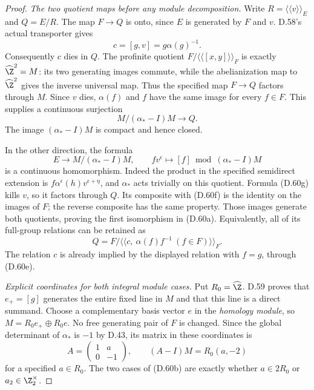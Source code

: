 \begin{proof}
\emph{The two quotient maps before any module decomposition.}
Write $R=\langle\!\langle v\rangle\!\rangle_E$ and
$Q=E/R$. The map $F\to Q$ is onto, since $E$
is generated by $F$ and $v$.
D.58's actual transporter gives
\[
                  c=[g,v]=g\alpha(g)^{-1}.               \tag{D.60e}
\]
Consequently $c$ dies in $Q$.
The profinite quotient
$F/\langle\!\langle[x,y]\rangle\!\rangle_F$
is exactly $\widehat\Z^2=M$: its two generating
images commute, while the abelianization map
to $\widehat\Z^2$ gives the inverse universal map.
Thus the specified map $F\to Q$ factors through
$M$.
Since $v$ dies, $\alpha(f)$ and $f$ have the same
image for every $f\in F$. This supplies a
continuous surjection
\[
                 M/(\alpha_*-I)M\longrightarrow Q.       \tag{D.60f}
\]
The image $(\alpha_*-I)M$ is compact and hence
closed.

In the other direction, the formula
\[
 E\longrightarrow M/(\alpha_*-I)M,\qquad
           f v^\epsilon\longmapsto [f]\bmod(\alpha_*-I)M
                                                               \tag{D.60g}
\]
is a continuous homomorphism. Indeed the product
in the specified semidirect extension is
$f\alpha^\epsilon(h)v^{\epsilon+\eta}$, and
$\alpha_*$ acts trivially on this quotient.
Formula (D.60g) kills $v$, so it factors through
$Q$. Its composite with (D.60f) is the identity
on the images of $F$; the reverse composite has
the same property. Those images generate both
quotients, proving the first isomorphism in
(D.60a).
Equivalently, all of its full-group relations
can be retained as
\[
 Q=F/\langle\!\langle
       c,\ \alpha(f)f^{-1}\ (f\in F)
                         \rangle\!\rangle_F .
                                                               \tag{D.60h}
\]
The relation $c$ is already implied by the
displayed relation with $f=g$, through (D.60e).

\emph{Explicit coordinates for both integral module cases.}
Put $R_0=\widehat\Z$.
D.59 proves that $e_+=[g]$ generates the entire
fixed line in $M$ and that this line is a direct
summand. Choose a complementary basis vector
$e$ in the \emph{homology module}, so
$M=R_0 e_+\oplus R_0 e$.
No free generating pair of $F$ is changed.
Since the global determinant of $\alpha_*$ is
$-1$ by D.43, its matrix in these coordinates is
\[
 A=\begin{pmatrix}1&a\\0&-1\end{pmatrix},\qquad
  (A-I)M=R_0(a,-2)                                      \tag{D.60i}
\]
for a specified $a\in R_0$.
The two cases of (D.60b) are exactly whether
$a\in2R_0$ or $a_2\in\Z_2^\times$.


\end{proof}

